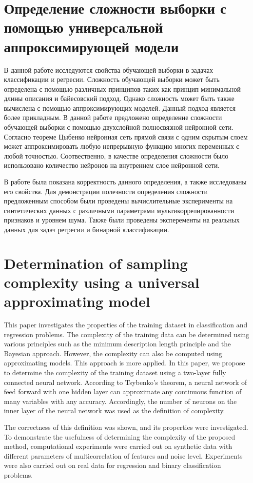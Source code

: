 \documentclass[a4paper,14pt]{extarticle}
\numberwithin{equation}{section}
\begin{document}
	\section*{Определение сложности выборки с помощью универсальной аппроксимирующей модели}
	В данной работе исследуются свойства обучающей выборки в задачах классификации и регресии. Сложность обучающей выборки может быть определена с помощью различных принципов таких как принцип минимальной длины описания и байесовский подход. Однако сложность может быть также вычислена с помощью аппроксимирующих моделей. Данный подход является более прикладным. В данной работе предложено определение сложности обучающей выборки с помощью двухслойной полносвязной нейронной сети. Согласно теореме Цыбенко нейронная сеть прямой связи с одним скрытым слоем может аппроксимировать любую непрерывную функцию многих переменных с любой точностью. Соотвественно, в качестве определения сложности было использовано количество нейронов на внутреннем слое нейронной сети. 
	
	В работе была показана корректность данного определения, а также исследованы его свойства. Для демонстрации полезности определения сложности предложенным способом были проведены вычислительные эксперименты на синтетических данных с различными параметрами мультикоррелированности признаков и уровнем шума. Также были проведены эксперементы на реальных данных для задач регресии и бинарной классификации. 
	
	\section*{Determination of sampling complexity using a universal approximating model}
	
	This paper investigates the properties of the training dataset in classification and regression problems. The complexity of the training data can be determined using various principles such as the minimum description length principle and the Bayesian approach. However, the complexity can also be computed using approximating models. This approach is more applied. In this paper, we propose to determine the complexity of the training dataset using a two-layer fully connected neural network. According to Tsybenko's theorem, a neural network of feed forward with one hidden layer can approximate any continuous function of many variables with any accuracy. Accordingly, the number of neurons on the inner layer of the neural network was used as the definition of complexity. 
	
	The correctness of this definition was shown, and its properties were investigated. To demonstrate the usefulness of determining the complexity of the proposed method, computational experiments were carried out on synthetic data with different parameters of multicorrelation of features and noise level. Experiments were also carried out on real data for regression and binary classification problems.
\end{document}
